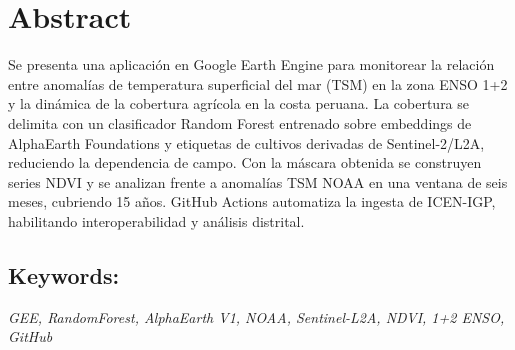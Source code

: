 \vspace{-4em}
\section*{Abstract}
\sloppy

  Se presenta una aplicación en Google Earth Engine para monitorear la relación entre anomalías de temperatura superficial del mar (TSM) en la zona ENSO 1+2 y la dinámica de la cobertura agrícola en la costa peruana. La cobertura se delimita con un clasificador Random Forest entrenado sobre embeddings de AlphaEarth Foundations y etiquetas de cultivos derivadas de Sentinel-2/L2A, reduciendo la dependencia de campo. Con la máscara obtenida se construyen series NDVI y se analizan frente a anomalías TSM NOAA en una ventana de seis meses, cubriendo 15 años. GitHub Actions automatiza la ingesta de ICEN-IGP, habilitando interoperabilidad y análisis distrital.

  \subsection*{\textbf{Keywords:}}
  \textit{GEE, RandomForest, AlphaEarth V1, NOAA, Sentinel-L2A, NDVI, 1+2 ENSO, GitHub}

